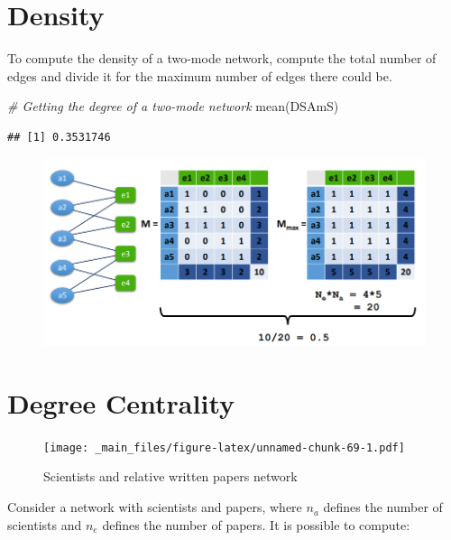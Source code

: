 \documentclass[
  notitlepage,
  onecolumn,
  openany]{book}
\newenvironment{Shaded}{\begin{snugshade}}{\end{snugshade}}
\newcommand{\CommentTok}[1]{\textcolor[rgb]{0.56,0.35,0.01}{\textit{#1}}}
\newcommand{\FunctionTok}[1]{\textcolor[rgb]{0.00,0.00,0.00}{#1}}
\newcommand{\NormalTok}[1]{#1}
\begin{document}
\hypertarget{density-1}{%
\section{Density}\label{density-1}}

To compute the density of a two-mode network, compute the total number of edges and divide it for the maximum number of edges there could be.

\begin{Shaded}
\begin{Highlighting}[]
\CommentTok{\# Getting the degree of a two{-}mode network}
\FunctionTok{mean}\NormalTok{(DSAmS)}
\end{Highlighting}
\end{Shaded}

\begin{verbatim}
## [1] 0.3531746
\end{verbatim}

\begin{figure}[h!]

{\centering \includegraphics[width=0.7\linewidth]{images/10-Two mode networks/Untitled 3} 

}

\end{figure}

\hypertarget{degree-centrality-2}{%
\section{Degree Centrality}\label{degree-centrality-2}}

\begin{figure}
\centering
\texttt{[image: \_main\_files/figure-latex/unnamed-chunk-69-1.pdf]}
\caption{\label{fig:unnamed-chunk-69}Scientists and relative written papers network}
\end{figure}

Consider a network with scientists and papers, where \(n_a\) defines the number of scientists and \(n_e\) defines the number of papers. It is possible to compute:
\end{document}
